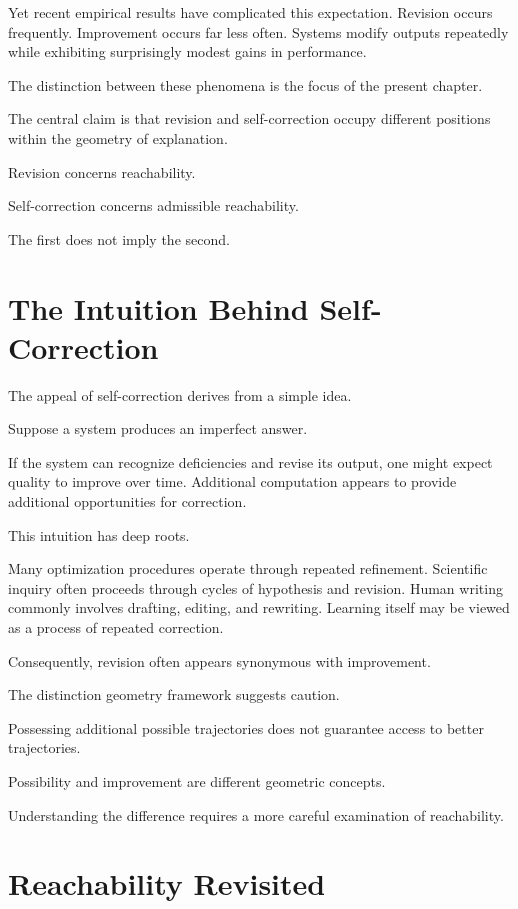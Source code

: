\documentclass[11pt,oneside,openany]{book}
\begin{document}
Yet recent empirical results have complicated this expectation. Revision occurs frequently. Improvement occurs far less often. Systems modify outputs repeatedly while exhibiting surprisingly modest gains in performance.

The distinction between these phenomena is the focus of the present chapter.

The central claim is that revision and self-correction occupy different positions within the geometry of explanation.

Revision concerns reachability.

Self-correction concerns admissible reachability.

The first does not imply the second.

\section{The Intuition Behind Self-Correction}

The appeal of self-correction derives from a simple idea.

Suppose a system produces an imperfect answer.

If the system can recognize deficiencies and revise its output, one might expect quality to improve over time. Additional computation appears to provide additional opportunities for correction.

This intuition has deep roots.

Many optimization procedures operate through repeated refinement. Scientific inquiry often proceeds through cycles of hypothesis and revision. Human writing commonly involves drafting, editing, and rewriting. Learning itself may be viewed as a process of repeated correction.

Consequently, revision often appears synonymous with improvement.

The distinction geometry framework suggests caution.

Possessing additional possible trajectories does not guarantee access to better trajectories.

Possibility and improvement are different geometric concepts.

Understanding the difference requires a more careful examination of reachability.

\section{Reachability Revisited}
\end{document}
